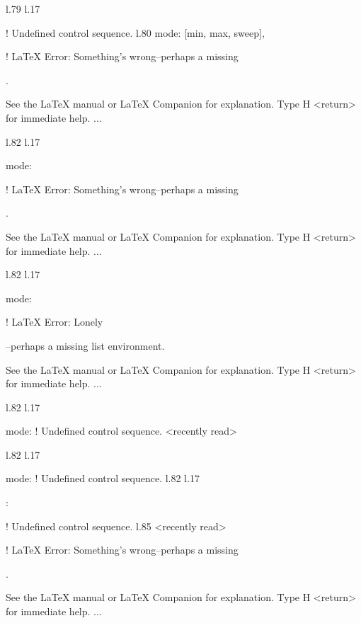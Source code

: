 {{{{{{{{{{{l.79 l.17     \item \xmlNode
                            
! Undefined control sequence.
l.80                        {mode}: \xmlDesc
                                            {[min, max, sweep]},

! LaTeX Error: Something's wrong--perhaps a missing \item.

See the LaTeX manual or LaTeX Companion for explanation.
Type  H <return>  for immediate help.
 ...                                              
                                                  
l.82 l.17     \item \xmlNode
                            {mode}: \xmlDesc

! LaTeX Error: Something's wrong--perhaps a missing \item.

See the LaTeX manual or LaTeX Companion for explanation.
Type  H <return>  for immediate help.
 ...                                              
                                                  
l.82 l.17     \item \xmlNode
                            {mode}: \xmlDesc

! LaTeX Error: Lonely \item--perhaps a missing list environment.

See the LaTeX manual or LaTeX Companion for explanation.
Type  H <return>  for immediate help.
 ...                                              
                                                  
l.82 l.17     \item \xmlNode
                            {mode}: \xmlDesc
! Undefined control sequence.
<recently read> \xmlNode 
                         
l.82 l.17     \item \xmlNode
                            {mode}: \xmlDesc
! Undefined control sequence.
l.82 l.17     \item {}: \xmlDesc
                                            
! Undefined control sequence.
l.85 <recently read> \xmlNode
                             

! LaTeX Error: Something's wrong--perhaps a missing \item.

See the LaTeX manual or LaTeX Companion for explanation.
Type  H <return>  for immediate help.
 ...                                              
                                                  
}}}}}}}}}}}
